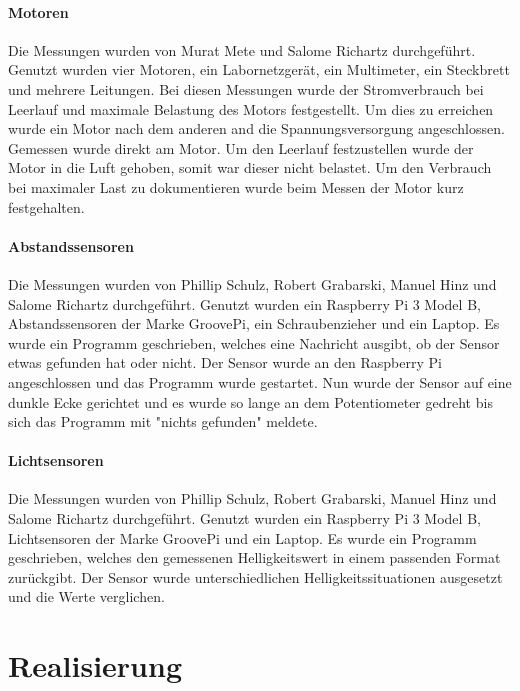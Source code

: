 \documentclass[notitlepage]{report}
\begin{document}
\subsubsection{Motoren}

Die Messungen wurden von Murat Mete und Salome Richartz durchgef\"{u}hrt. Genutzt wurden vier Motoren, ein Labornetzger\"{a}t, ein Multimeter, ein Steckbrett und mehrere Leitungen. Bei diesen Messungen wurde der Stromverbrauch bei Leerlauf und maximale Belastung des Motors festgestellt. Um dies zu erreichen wurde ein Motor nach dem anderen and die Spannungsversorgung angeschlossen. Gemessen wurde direkt am Motor. Um den Leerlauf festzustellen wurde der Motor in die Luft gehoben, somit war dieser nicht belastet. Um den Verbrauch bei maximaler Last zu dokumentieren wurde beim Messen der Motor kurz festgehalten.

\subsubsection{Abstandssensoren}

Die Messungen wurden von Phillip Schulz, Robert Grabarski, Manuel Hinz und Salome Richartz durchgef\"{u}hrt. Genutzt wurden ein Raspberry Pi 3 Model B, Abstandssensoren der Marke GroovePi, ein Schraubenzieher und ein Laptop. Es wurde ein Programm geschrieben, welches eine Nachricht ausgibt, ob der Sensor etwas gefunden hat oder nicht. Der Sensor wurde an den Raspberry Pi angeschlossen und das Programm wurde gestartet. Nun wurde der Sensor auf eine dunkle Ecke gerichtet und es wurde so lange an dem Potentiometer gedreht bis sich das Programm mit "nichts gefunden" meldete.

\subsubsection{Lichtsensoren}

Die Messungen wurden von Phillip Schulz, Robert Grabarski, Manuel Hinz und Salome Richartz durchgef\"{u}hrt. Genutzt wurden ein Raspberry Pi 3 Model B, Lichtsensoren der Marke GroovePi und ein Laptop. Es wurde ein Programm geschrieben, welches den gemessenen Helligkeitswert in einem passenden Format zur\"{u}ckgibt. Der Sensor wurde unterschiedlichen Helligkeitssituationen ausgesetzt und die Werte verglichen.


\chapter{Realisierung}
\end{document}
